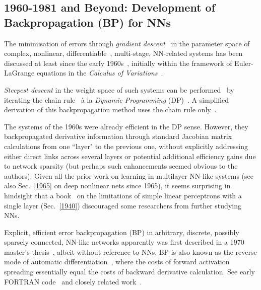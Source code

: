 \documentclass[letterpaper]{article}
\begin{document}
\begin{CJK*}{UTF8}{gbsn}
\begin{sloppypar}
\subsection{1960-1981 and Beyond: Development of Backpropagation (BP) for NNs}
\label{1970}
The minimisation of  
errors through {\em gradient descent}~\citep{hadamard1908memoire} in
the parameter space of complex, 
nonlinear, differentiable~\citep{leibniz1684}, multi-stage, NN-related systems has been discussed 
at least since the early 1960s~\citep[e.g.,][]{Kelley:1960,bryson:1961,BRYSON-DENHAM-61A,PONTRYAGIN61A,dreyfus:1962,Wilkinson:1965,Amari:1967:TAP,bryson1969applied,director:1969},
initially within the framework of Euler-LaGrange equations in the {\em Calculus of Variations}~\citep[e.g.,][]{Euler:1744}.

{\em Steepest descent} in the weight space of 
such systems can be performed~\citep{bryson:1961,Kelley:1960,bryson1969applied} 
by iterating the chain rule~\citep{leibniz:1676,de1716analyse} 
\`{a} la {\em Dynamic Programming} (DP)~\citep{Bellman:1957}.
A simplified derivation of this backpropagation method uses the chain rule only~\citep{dreyfus:1962}.

The systems of the 1960s were already efficient in the DP sense.
However, they backpropagated derivative information through
standard Jacobian matrix calculations from one ``layer" to the previous one,
without explicitly addressing either direct links across several layers or potential additional efficiency gains due to network sparsity 
(but perhaps such enhancements seemed obvious to the authors).
Given all the prior work on learning in multilayer NN-like systems (see also Sec.~\ref{1965}
on deep nonlinear nets since 1965),
it seems surprising in hindsight that a book~\citep{MinskyPapert:69} 
on the limitations of simple linear 
perceptrons with a single layer (Sec.~\ref{1940})
discouraged some researchers from further studying NNs.


Explicit, efficient error backpropagation (BP) in arbitrary, discrete, possibly sparsely connected, 
NN-like networks apparently was first described 
 in a 1970 master's thesis~\citep{Linnainmaa:1970,Linnainmaa:1976}, albeit without reference to NNs.
BP is also known as the reverse mode of automatic differentiation~\citep{Griewank:2012}, 
where the costs of forward activation spreading essentially equal the costs of backward 
derivative calculation. 
See early FORTRAN code~\citep{Linnainmaa:1970} and closely related work~\citep{ostrovskii:1971}.


\end{sloppypar}
\end{CJK*}
\end{document}
